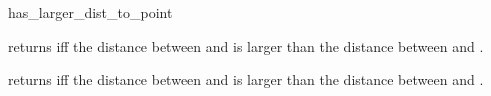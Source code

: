 \begin{ccRefFunction}{has_larger_dist_to_point}

         {returns  iff the distance between 
          and  is larger than the distance between 
          and .}

         {returns  iff the distance between 
          and  is larger than the distance between 
          and .}
\end{ccRefFunction}

